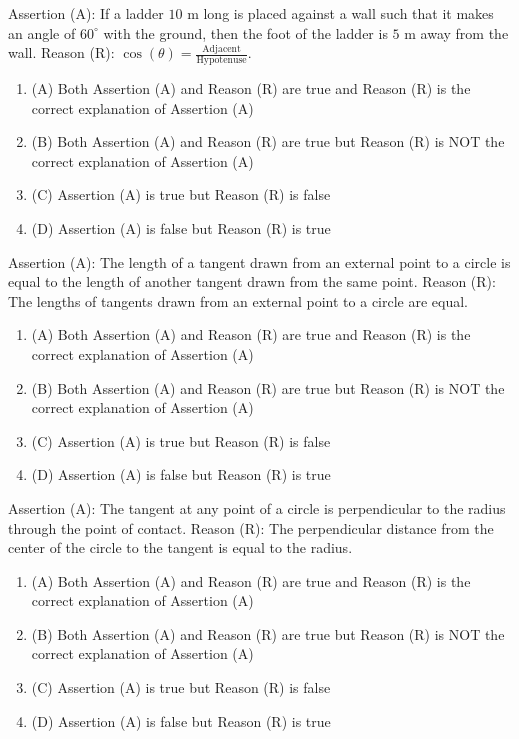 \documentclass[12pt,a4paper]{exam}
\begin{document}
\begin{questions}
\question[1] Assertion (A): If a ladder $10 \text{ m}$ long is placed against a wall such that it makes an angle of $60^\circ$ with the ground, then the foot of the ladder is $5 \text{ m}$ away from the wall. Reason (R): $\cos(\theta) = \frac{\text{Adjacent}}{\text{Hypotenuse}}$.
\begin{enumerate}[label=(\Alph*)]
  \item (A) Both Assertion (A) and Reason (R) are true and Reason (R) is the correct explanation of Assertion (A)
  \item (B) Both Assertion (A) and Reason (R) are true but Reason (R) is NOT the correct explanation of Assertion (A)
  \item (C) Assertion (A) is true but Reason (R) is false
  \item (D) Assertion (A) is false but Reason (R) is true
\end{enumerate}
\vspace{0.15cm}

\question[1] Assertion (A): The length of a tangent drawn from an external point to a circle is equal to the length of another tangent drawn from the same point. Reason (R): The lengths of tangents drawn from an external point to a circle are equal.
\begin{enumerate}[label=(\Alph*)]
  \item (A) Both Assertion (A) and Reason (R) are true and Reason (R) is the correct explanation of Assertion (A)
  \item (B) Both Assertion (A) and Reason (R) are true but Reason (R) is NOT the correct explanation of Assertion (A)
  \item (C) Assertion (A) is true but Reason (R) is false
  \item (D) Assertion (A) is false but Reason (R) is true
\end{enumerate}
\vspace{0.15cm}

\question[1] Assertion (A): The tangent at any point of a circle is perpendicular to the radius through the point of contact. Reason (R): The perpendicular distance from the center of the circle to the tangent is equal to the radius.
\begin{enumerate}[label=(\Alph*)]
  \item (A) Both Assertion (A) and Reason (R) are true and Reason (R) is the correct explanation of Assertion (A)
  \item (B) Both Assertion (A) and Reason (R) are true but Reason (R) is NOT the correct explanation of Assertion (A)
  \item (C) Assertion (A) is true but Reason (R) is false
  \item (D) Assertion (A) is false but Reason (R) is true
\end{enumerate}
\vspace{0.15cm}


\end{questions}
\end{document}
